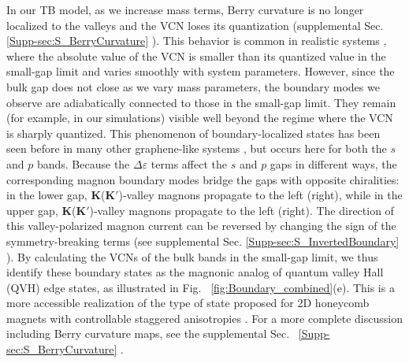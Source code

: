 \documentclass[aps,prx,twocolumn,superscriptaddress,floatfix]{revtex4-2}
\begin{document}
In our TB model, as we increase mass terms, Berry curvature is no longer localized to the valleys and the VCN loses its quantization (supplemental Sec. \ref{Supp-sec:S_BerryCurvature} \cite{Supplemental}). This behavior is common in realistic systems \cite{lee_gapped_2022, zhu_design_2018, lee_quantum_2020}, where the absolute value of the VCN is smaller than its quantized value in the small-gap limit and varies smoothly with system parameters. However, since the bulk gap does not close as we vary mass parameters, the boundary modes we observe are adiabatically connected to those in the small-gap limit. They remain (for example, in our simulations) visible well beyond the regime where the VCN is sharply quantized. This phenomenon of boundary-localized states has been seen before in many other graphene-like systems \cite{lu_observation_2017, yang_acoustic_2018, wang_extended_2022, noh_observation_2018, zhang_achieving_2018, wang_ultracompact_2022, funayama_quantum_2024}, but occurs here for both the $s$ and $p$ bands. Because the $\Delta\varepsilon$ terms affect the $s$ and $p$ gaps in different ways, the corresponding magnon boundary modes bridge the gaps with opposite chiralities: in the lower gap, $\mathbf{K}$($\mathbf{K'}$)-valley magnons propagate to the left (right), while in the upper gap, $\mathbf{K}$($\mathbf{K'}$)-valley magnons propagate to the left (right). The direction of this valley-polarized magnon current can be reversed by changing the sign of the symmetry-breaking terms (see supplemental Sec. \ref{Supp-sec:S_InvertedBoundary} \cite{Supplemental}). By calculating the VCNs of the bulk bands in the small-gap limit, we thus identify these boundary states as the magnonic analog of quantum valley Hall (QVH) edge states\cite{yao_edge_2009, zhang_valley_2013}, as illustrated in Fig. ~\ref{fig:Boundary_combined}(e). This is a more accessible realization of the type of state proposed for 2D honeycomb magnets with controllable staggered anisotropies \cite{hidalgo-sacoto_magnon_2020}. For a more complete discussion including Berry curvature maps, see the supplemental Sec. ~\ref{Supp-sec:S_BerryCurvature} \cite{Supplemental}.
\end{document}

